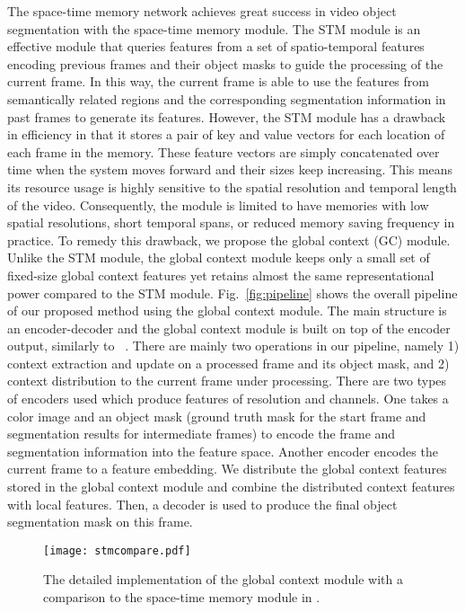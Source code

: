 \documentclass[runningheads]{llncs}
\begin{document}
The space-time memory network \cite{stm} achieves great success in video object segmentation with the space-time memory module. The STM module is an effective module that queries features from a set of spatio-temporal features encoding previous frames and their object masks to guide the processing of the current frame. In this way, the current frame is able to use the features from semantically related regions and the corresponding segmentation information in past frames to generate its features. However, the STM module has a drawback in efficiency in that it stores a pair of key and value vectors for each location of each frame in the memory. These feature vectors are simply concatenated over time when the system moves forward and their sizes keep increasing. This means its resource usage is highly sensitive to the spatial resolution and temporal length of the video. Consequently, the module is limited to have memories with low spatial resolutions, short temporal spans, or reduced memory saving frequency in practice. To remedy this drawback, we propose the global context (GC) module. Unlike the STM module, the global context module keeps only a small set of fixed-size global context features yet retains almost the same representational power compared to the STM module. Fig.~\ref{fig:pipeline} shows the overall pipeline of our proposed method using the global context module. The main structure is an encoder-decoder and the global context module is built on top of the encoder output, similarly to ~\cite{stm}.  There are mainly two operations in our pipeline, namely 1) context extraction and update on a processed frame and its object mask, and 2) context distribution to the current frame under processing. There are two types of encoders used which produce features of  resolution and  channels. One takes a color image and an object mask (ground truth mask for the start frame and segmentation results for intermediate frames) to encode the frame and segmentation information into the feature space. Another encoder encodes the current frame to a feature embedding. We distribute the global context features stored in the global context module and combine the distributed context features with local features. Then, a decoder is used to produce the final object segmentation mask on this frame.

\begin{figure*}[tb]
    \texttt{[image: stmcompare.pdf]}
    \caption{The detailed implementation of the global context module with a comparison to the space-time memory module in \cite{stm}.}
    \label{fig:compare}
\end{figure*}
\end{document}
